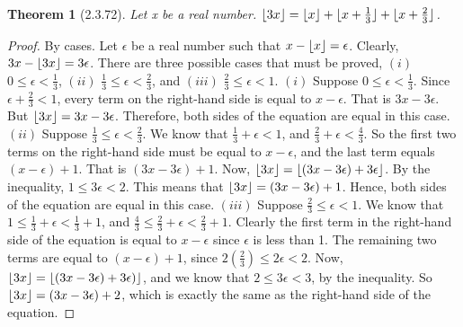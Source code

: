 \documentclass[a4paper, 12pt]{article}
\theoremstyle{plain}
\newtheorem*{theorem*}{Theorem}
\DeclarePairedDelimiter{\floor}{\lfloor}{\rfloor}
\begin{document}
	
	\begin{theorem*}[2.3.72]
		Let x be a real number. $\floor{3x} = \floor{x} + \floor{x + \frac{1}{3}} + \floor{x + \frac{2}{3}}$.
	\end{theorem*}
	
	\begin{proof}
		By cases. Let $\epsilon$ be a real number such that $x - \floor{x} = \epsilon$. Clearly, $3x - \floor{3x} = 3\epsilon$. There are three possible cases that must be proved, \newline $(i)$ $0 \le \epsilon < \frac{1}{3}$, $(ii)$ $\frac{1}{3} \le \epsilon < \frac{2}{3}$, and $(iii)$ $\frac{2}{3} \le \epsilon < 1$.
		\newline
		\newline
		$(i)$ Suppose $0 \le \epsilon < \frac{1}{3}$. Since $\epsilon + \frac{2}{3} < 1$, every term on the right-hand side is equal to $x - \epsilon$. That is $3x - 3\epsilon$. But $\floor{3x} = 3x - 3\epsilon$. Therefore, both sides of the equation are equal in this case.
		\newline
		\newline
		$(ii)$ Suppose $\frac{1}{3} \le \epsilon < \frac{2}{3}$. We know that $\frac{1}{3} + \epsilon < 1$, and $\frac{2}{3} + \epsilon < \frac{4}{3}$. So the first two terms on the right-hand side must be equal to $x - \epsilon$, and the last term equals $(x - \epsilon) + 1$. That is $(3x - 3\epsilon) + 1$. Now, $\floor{3x} = \floor{(3x - 3\epsilon) + 3\epsilon}$. By the inequality, $1 \le 3\epsilon < 2$. This means that $\floor{3x} = (3x - 3\epsilon) + 1$. Hence, both sides of the equation are equal in this case.
		\newline
		\newline
		$(iii)$ Suppose $\frac{2}{3} \le \epsilon < 1$. We know that $1 \le \frac{1}{3} + \epsilon < \frac{1}{3} + 1$, and \newline $\frac{4}{3} \le \frac{2}{3} + \epsilon < \frac{2}{3} + 1$. Clearly the first term in the right-hand side of the equation is equal to $x - \epsilon$ since $\epsilon$ is less than 1. The remaining two terms are equal to $(x - \epsilon) + 1$, since $2(\frac{2}{3}) \le 2\epsilon < 2$. Now, $\floor{3x} = \floor{(3x - 3\epsilon) + 3\epsilon)}$, and we know that $2 \le 3\epsilon < 3$, by the inequality. So $\floor{3x} = (3x - 3\epsilon) + 2$, which is exactly the same as the right-hand side of the equation.
	\end{proof}
\end{document}
